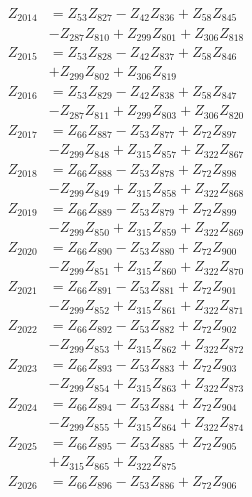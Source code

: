 \begin{multicols}{2}
\begin{align}
Z_{2014} &= Z_{53}Z_{827} - Z_{42}Z_{836} + Z_{58}Z_{845}  \nonumber \\
&- Z_{287}Z_{810} + Z_{299}Z_{801} + Z_{306}Z_{818} \nonumber \\
Z_{2015} &= Z_{53}Z_{828} - Z_{42}Z_{837} + Z_{58}Z_{846}  \nonumber \\
&+ Z_{299}Z_{802} + Z_{306}Z_{819} \nonumber \\
Z_{2016} &= Z_{53}Z_{829} - Z_{42}Z_{838} + Z_{58}Z_{847}  \nonumber \\
&- Z_{287}Z_{811} + Z_{299}Z_{803} + Z_{306}Z_{820} \nonumber \\
Z_{2017} &= Z_{66}Z_{887} - Z_{53}Z_{877} + Z_{72}Z_{897}  \nonumber \\
&- Z_{299}Z_{848} + Z_{315}Z_{857} + Z_{322}Z_{867} \nonumber \\
Z_{2018} &= Z_{66}Z_{888} - Z_{53}Z_{878} + Z_{72}Z_{898}  \nonumber \\
&- Z_{299}Z_{849} + Z_{315}Z_{858} + Z_{322}Z_{868} \nonumber \\
Z_{2019} &= Z_{66}Z_{889} - Z_{53}Z_{879} + Z_{72}Z_{899}  \nonumber \\
&- Z_{299}Z_{850} + Z_{315}Z_{859} + Z_{322}Z_{869} \nonumber \\
Z_{2020} &= Z_{66}Z_{890} - Z_{53}Z_{880} + Z_{72}Z_{900}  \nonumber \\
&- Z_{299}Z_{851} + Z_{315}Z_{860} + Z_{322}Z_{870} \nonumber \\
Z_{2021} &= Z_{66}Z_{891} - Z_{53}Z_{881} + Z_{72}Z_{901}  \nonumber \\
&- Z_{299}Z_{852} + Z_{315}Z_{861} + Z_{322}Z_{871} \nonumber \\
Z_{2022} &= Z_{66}Z_{892} - Z_{53}Z_{882} + Z_{72}Z_{902}  \nonumber \\
&- Z_{299}Z_{853} + Z_{315}Z_{862} + Z_{322}Z_{872} \nonumber \\
Z_{2023} &= Z_{66}Z_{893} - Z_{53}Z_{883} + Z_{72}Z_{903}  \nonumber \\
&- Z_{299}Z_{854} + Z_{315}Z_{863} + Z_{322}Z_{873} \nonumber \\
Z_{2024} &= Z_{66}Z_{894} - Z_{53}Z_{884} + Z_{72}Z_{904}  \nonumber \\
&- Z_{299}Z_{855} + Z_{315}Z_{864} + Z_{322}Z_{874} \nonumber \\
Z_{2025} &= Z_{66}Z_{895} - Z_{53}Z_{885} + Z_{72}Z_{905}  \nonumber \\
&+ Z_{315}Z_{865} + Z_{322}Z_{875} \nonumber \\
Z_{2026} &= Z_{66}Z_{896} - Z_{53}Z_{886} + Z_{72}Z_{906}  \nonumber \\

\end{align}
\end{multicols}

